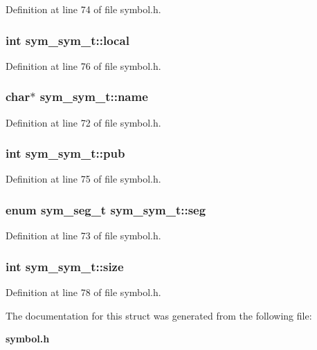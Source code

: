 Definition at line 74 of file symbol.h.
\subsubsection[{local}]{\setlength{\rightskip}{0pt plus 5cm}int {\bf sym\_\-sym\_\-t::local}}\label{structsym__sym__t_a70392af1b4faf259de19fceb57d26f1}




Definition at line 76 of file symbol.h.
\subsubsection[{name}]{\setlength{\rightskip}{0pt plus 5cm}char$\ast$ {\bf sym\_\-sym\_\-t::name}}\label{structsym__sym__t_8d6216a7826bc10b4a1e0c6bf44e3823}




Definition at line 72 of file symbol.h.
\subsubsection[{pub}]{\setlength{\rightskip}{0pt plus 5cm}int {\bf sym\_\-sym\_\-t::pub}}\label{structsym__sym__t_618ab3ad29be760d846719967638b290}




Definition at line 75 of file symbol.h.
\subsubsection[{seg}]{\setlength{\rightskip}{0pt plus 5cm}enum {\bf sym\_\-seg\_\-t} {\bf sym\_\-sym\_\-t::seg}}\label{structsym__sym__t_c9b71e8dea354279b2b4cd72c7b870f5}




Definition at line 73 of file symbol.h.
\subsubsection[{size}]{\setlength{\rightskip}{0pt plus 5cm}int {\bf sym\_\-sym\_\-t::size}}\label{structsym__sym__t_168b484608b1a73de037bdee2aa8d218}




Definition at line 78 of file symbol.h.

The documentation for this struct was generated from the following file:\begin{CompactItemize}
\item 
{\bf symbol.h}\end{CompactItemize}

